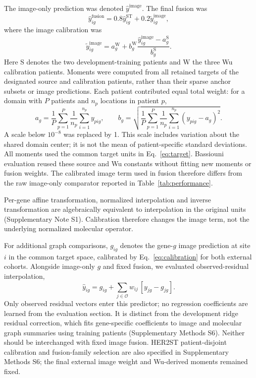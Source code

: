 The image-only prediction was denoted $\widehat y^{\mathrm{image}}$. The final fusion was
\begin{equation}
 \widehat y_{ig}^{\mathrm{fusion}}=0.8\widehat y_{ig}^{\mathrm{ST}}+
 0.2\widetilde y_{ig}^{\mathrm{image}},
 \label{eq:fusion}
\end{equation}
where the image calibration was
\begin{equation}
\widetilde y^{\mathrm{image}}_{ig}
=a^{\mathrm W}_g+b^{\mathrm W}_g
\frac{\widehat y^{\mathrm{image}}_{ig}-a^{\mathrm S}_g}{b^{\mathrm S}_g}.
\label{eq:calibration}
\end{equation}
Here $\mathrm S$ denotes the two development-training patients and $\mathrm W$ the three Wu calibration patients. Moments were computed from all retained targets of the designated source and calibration patients, rather than their sparse anchor subsets or image predictions. Each patient contributed equal total weight: for a domain with $P$ patients and $n_p$ locations in patient $p$,
\begin{equation}
 a_g=\frac{1}{P}\sum_{p=1}^{P}\frac{1}{n_p}\sum_{i=1}^{n_p}y_{pig},
 \qquad
 b_g=\sqrt{\frac{1}{P}\sum_{p=1}^{P}\frac{1}{n_p}\sum_{i=1}^{n_p}(y_{pig}-a_g)^2}.
\label{eq:moments}
\end{equation}
A scale below $10^{-8}$ was replaced by 1. This scale includes variation about the shared domain center; it is not the mean of patient-specific standard deviations. All moments used the common target units in Eq.~\ref{eq:target}. Bassiouni evaluation reused these source and Wu constants without fitting new moments or fusion weights. The calibrated image term used in fusion therefore differs from the raw image-only comparator reported in Table~\ref{tab:performance}.

Per-gene affine transformation, normalized interpolation and inverse transformation are algebraically equivalent to interpolation in the original units (Supplementary Note S1). Calibration therefore changes the image term, not the underlying normalized molecular operator.

For additional graph comparisons, $g_{ig}$ denotes the gene-$g$ image prediction at site $i$ in the common target space, calibrated by Eq.~\ref{eq:calibration} for both external cohorts. Alongside image-only $g$ and fixed fusion, we evaluated observed-residual interpolation,
\begin{equation}
\widehat y_{ig}=g_{ig}+\sum_{j\in\mathcal O}w_{ij}\,[y_{jg}-g_{jg}].
\label{eq:observed_residual}
\end{equation}
Only observed residual vectors enter this predictor; no regression coefficients are learned from the evaluation section. It is distinct from the development ridge residual correction, which fits gene-specific coefficients to image and molecular graph summaries using training patients (Supplementary Methods S6). Neither should be interchanged with fixed image fusion. HER2ST patient-disjoint calibration and fusion-family selection are also specified in Supplementary Methods S6; the final external image weight and Wu-derived moments remained fixed.

